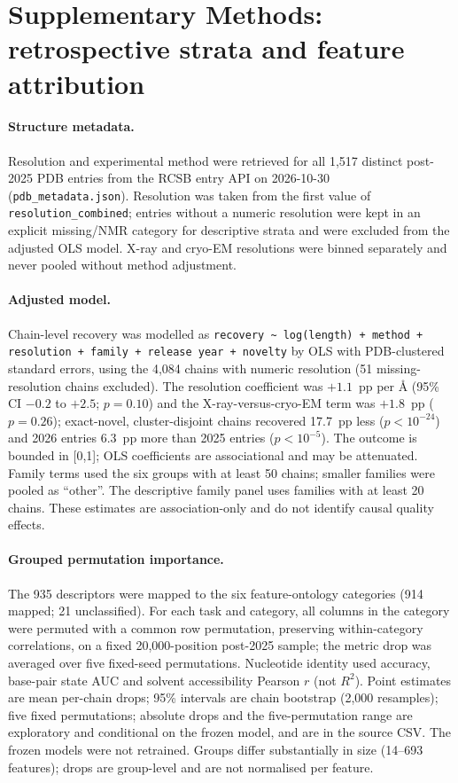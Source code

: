 \documentclass[pdflatex,sn-nature]{sn-jnl}
\begin{document}
\section*{Supplementary Methods: retrospective strata and feature attribution}

\paragraph{Structure metadata.} Resolution and experimental method were retrieved for
all 1,517 distinct post-2025 PDB entries from the RCSB entry API on 2026-10-30
(\texttt{pdb\_metadata.json}). Resolution was taken from the first value of
\texttt{resolution\_combined}; entries without a numeric resolution were kept in an
explicit missing/NMR category for descriptive strata and were excluded from the adjusted
OLS model. X-ray and cryo-EM resolutions were binned separately and never pooled without
method adjustment.

\paragraph{Adjusted model.} Chain-level recovery was modelled as
\texttt{recovery \textasciitilde{} log(length) + method + resolution + family +
release year + novelty} by OLS with PDB-clustered standard errors, using the 4,084
chains with numeric resolution (51 missing-resolution chains excluded). The resolution coefficient was $+1.1$~pp per \AA{}
(95\% CI $-0.2$ to $+2.5$; $p=0.10$) and the X-ray-versus-cryo-EM term was $+1.8$~pp
($p=0.26$); exact-novel, cluster-disjoint chains recovered 17.7~pp less ($p<10^{-24}$)
and 2026 entries 6.3~pp more than 2025 entries ($p<10^{-5}$). The outcome is bounded in
[0,1]; OLS coefficients are associational and may be attenuated. Family terms used the six groups with at least 50 chains; smaller families were pooled as
``other''. The descriptive family panel uses families with at least 20 chains. These estimates are association-only and do not
identify causal quality effects.

\paragraph{Grouped permutation importance.} The 935 descriptors were mapped to the six
feature-ontology categories (914 mapped; 21 unclassified). For each task and category,
all columns in the category were permuted with a common row permutation, preserving
within-category correlations, on a fixed 20,000-position post-2025 sample; the metric
drop was averaged over five fixed-seed permutations. Nucleotide identity used accuracy, base-pair state AUC and solvent accessibility Pearson $r$ (not $R^2$). Point estimates are mean per-chain drops; 95\% intervals are chain bootstrap (2,000 resamples); five fixed permutations; absolute drops and the five-permutation range are exploratory and conditional on the frozen model, and are in the source CSV. The frozen models were not retrained. Groups differ substantially in size (14--693 features); drops are group-level and are not normalised per feature.
\end{document}
